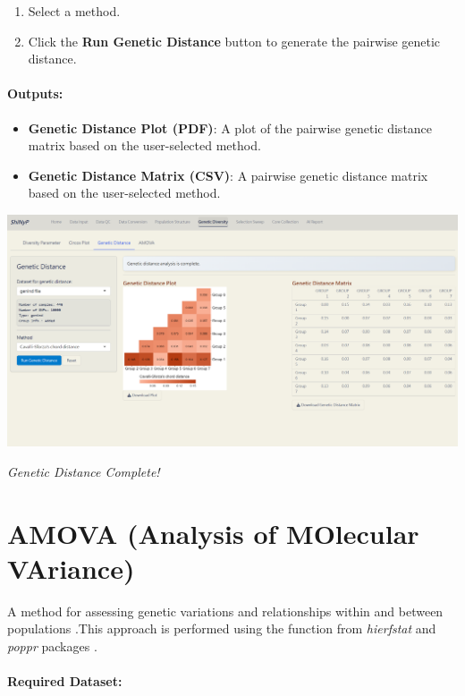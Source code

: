 \documentclass[
]{book}
\begin{document}
\begin{enumerate}
\def\labelenumi{\arabic{enumi}.}
\item
  Select a method.
\item
  Click the {\textbf{Run Genetic Distance}} button to generate the pairwise genetic distance.
\end{enumerate}

\paragraph*{Outputs:}\label{outputs-14}

\begin{itemize}
\item
  \textbf{Genetic Distance Plot (PDF)}: A plot of the pairwise genetic distance matrix based on the user-selected method.
\item
  \textbf{Genetic Distance Matrix (CSV)}: A pairwise genetic distance matrix based on the user-selected method.
\end{itemize}

\includegraphics{images/clipboard-124406020.png}

\emph{Genetic Distance Complete!}

\section{AMOVA (Analysis of MOlecular VAriance)}\label{amova-analysis-of-molecular-variance}

A method for assessing genetic variations and relationships within and between populations \citep{excoffier1992}.This approach is performed using the function from \emph{hierfstat} and \emph{poppr} packages \citep{kamvar2014, goudet2004}.

\paragraph*{Required Dataset:}\label{required-dataset-7}
\end{document}
